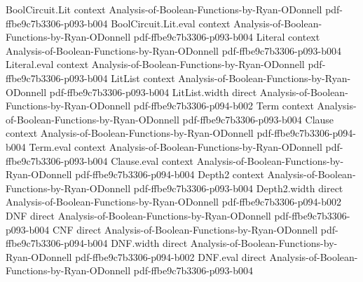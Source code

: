 \begin{theorem}
\leanok
{}
\proofstep
  {BoolCircuit.Lit}
  {context}
  {Analysis-of-Boolean-Functions-by-Ryan-ODonnell}
  {pdf-ffbe9c7b3306-p093-b004}
\proofstep
  {BoolCircuit.Lit.eval}
  {context}
  {Analysis-of-Boolean-Functions-by-Ryan-ODonnell}
  {pdf-ffbe9c7b3306-p093-b004}
\proofstep
  {Literal}
  {context}
  {Analysis-of-Boolean-Functions-by-Ryan-ODonnell}
  {pdf-ffbe9c7b3306-p093-b004}
\proofstep
  {Literal.eval}
  {context}
  {Analysis-of-Boolean-Functions-by-Ryan-ODonnell}
  {pdf-ffbe9c7b3306-p093-b004}
\proofstep
  {LitList}
  {context}
  {Analysis-of-Boolean-Functions-by-Ryan-ODonnell}
  {pdf-ffbe9c7b3306-p093-b004}
\proofstep
  {LitList.width}
  {direct}
  {Analysis-of-Boolean-Functions-by-Ryan-ODonnell}
  {pdf-ffbe9c7b3306-p094-b002}
\proofstep
  {Term}
  {context}
  {Analysis-of-Boolean-Functions-by-Ryan-ODonnell}
  {pdf-ffbe9c7b3306-p093-b004}
\proofstep
  {Clause}
  {context}
  {Analysis-of-Boolean-Functions-by-Ryan-ODonnell}
  {pdf-ffbe9c7b3306-p094-b004}
\proofstep
  {Term.eval}
  {context}
  {Analysis-of-Boolean-Functions-by-Ryan-ODonnell}
  {pdf-ffbe9c7b3306-p093-b004}
\proofstep
  {Clause.eval}
  {context}
  {Analysis-of-Boolean-Functions-by-Ryan-ODonnell}
  {pdf-ffbe9c7b3306-p094-b004}
\proofstep
  {Depth2}
  {context}
  {Analysis-of-Boolean-Functions-by-Ryan-ODonnell}
  {pdf-ffbe9c7b3306-p093-b004}
\proofstep
  {Depth2.width}
  {direct}
  {Analysis-of-Boolean-Functions-by-Ryan-ODonnell}
  {pdf-ffbe9c7b3306-p094-b002}
\proofstep
  {DNF}
  {direct}
  {Analysis-of-Boolean-Functions-by-Ryan-ODonnell}
  {pdf-ffbe9c7b3306-p093-b004}
\proofstep
  {CNF}
  {direct}
  {Analysis-of-Boolean-Functions-by-Ryan-ODonnell}
  {pdf-ffbe9c7b3306-p094-b004}
\proofstep
  {DNF.width}
  {direct}
  {Analysis-of-Boolean-Functions-by-Ryan-ODonnell}
  {pdf-ffbe9c7b3306-p094-b002}
\proofstep
  {DNF.eval}
  {direct}
  {Analysis-of-Boolean-Functions-by-Ryan-ODonnell}
  {pdf-ffbe9c7b3306-p093-b004}

\end{theorem}
